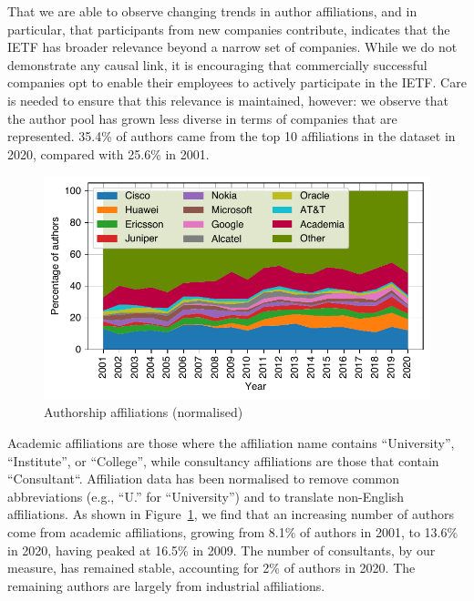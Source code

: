 \documentclass[twocolumn,10pt]{article}
\newlength{\figureWidthOneColumn}
\newcommand{\pb}[1]{\vspace{0.75ex}\noindent{\textbf{#1}}}
\begin{document}
That we are able to observe changing trends in author affiliations, and in
particular, that participants from new companies contribute, indicates that
the IETF has broader relevance beyond a narrow set of companies. While we
do not demonstrate any causal link, it is encouraging that commercially
successful companies opt to enable their employees to actively participate
in the IETF. Care is needed to ensure that this relevance is maintained,
however: we observe that the author pool has grown less diverse in terms of
companies that are represented. 35.4\% of authors came from the top 10
affiliations in the dataset in 2020, compared with 25.6\% in 2001. 


\begin{figure}
  \centering
  \includegraphics[width=\figureWidthOneColumn]{figures-prev/imc-2021/authors/top5_affiliations_normalised.pdf}
  \caption{
    Authorship affiliations (normalised)
  }
  \label{fig:author_affiliations_normalised}
\end{figure}

\pb{Academia and consultants:}
Academic affiliations are those where the affiliation name contains
``University'', ``Institute'', or ``College'', while consultancy
affiliations are those that contain ``Consultant``. Affiliation data has
been normalised to remove common abbreviations (e.g., ``U.'' for
``University'') and to translate non-English affiliations.  As shown in
Figure~\ref{fig:author_affiliations_normalised}, we find that an increasing
number of authors come from academic affiliations, growing from 8.1\% of
authors in 2001, to 13.6\% in 2020, having peaked at 16.5\% in 2009. The
number of consultants, by our measure, has remained stable, accounting for
2\% of authors in 2020.  The remaining authors are largely from industrial
affiliations.
\end{document}
